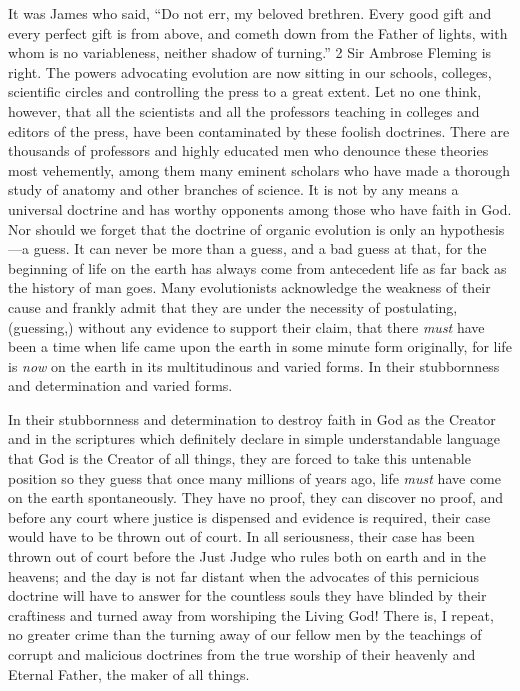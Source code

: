 It was James who said, ``Do not err, my beloved brethren. Every good gift and every perfect
gift is from above, and cometh down from the Father of lights, with whom is no variableness,
neither shadow of turning.'' 2 Sir Ambrose Fleming is right. The powers advocating
evolution are now sitting in our schools, colleges, scientific circles and controlling the press
to a great extent. Let no one think, however, that all the scientists and all the professors
teaching in colleges and editors of the press, have been contaminated by these foolish
doctrines. There are thousands of professors and highly educated men who denounce these
theories most vehemently, among them many eminent scholars who have made a thorough
study of anatomy and other branches of science. It is not by any means a universal doctrine
and has worthy opponents among those who have faith in God. Nor should we forget that the
doctrine of organic evolution is only an hypothesis—a guess. It can never be more than a
guess, and a bad guess at that, for the beginning of life on the earth has always come from
antecedent life as far back as the history of man goes. Many evolutionists acknowledge the
weakness of their cause and frankly admit that they are under the necessity of postulating,
(guessing,) without any evidence to support their claim, that there \textit{must} have been a time
when life came upon the earth in some minute form originally, for life is \textit{now} on the earth in
its multitudinous and varied forms. In their stubbornness and determination and varied forms.

In their stubbornness and determination to destroy faith in God as the Creator and in the
scriptures which definitely declare in simple understandable language that God is the Creator
of all things, they are forced to take this untenable position so they guess that once many
millions of years ago, life \textit{must} have come on the earth spontaneously. They have no proof,
they can discover no proof, and before any court where justice is dispensed and evidence is
required, their case would have to be thrown out of court. In all seriousness, their case has
been thrown out of court before the Just Judge who rules both on earth and in the heavens;
and the day is not far distant when the advocates of this pernicious doctrine will have to
answer for the countless souls they have blinded by their craftiness and turned away from
worshiping the Living God! There is, I repeat, no greater crime than the turning away of our
fellow men by the teachings of corrupt and malicious doctrines from the true worship of their
heavenly and Eternal Father, the maker of all things.

